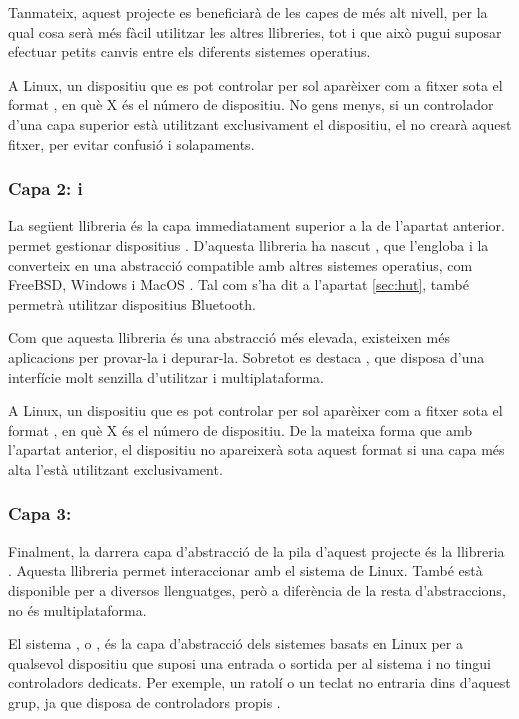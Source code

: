 Tanmateix, aquest projecte es beneficiarà de les capes de més alt nivell, per la qual cosa
serà més fàcil utilitzar les altres llibreries, tot i que això pugui suposar
efectuar petits canvis entre els diferents sistemes operatius.

A Linux, un dispositiu que es pot controlar per  sol aparèixer com
a fitxer sota el format , en què X és el número de dispositiu.
No gens menys, si un controlador d'una capa superior està utilitzant
exclusivament el dispositiu, el  no crearà aquest fitxer, per
evitar confusió i solapaments.

\subsubsection*{Capa 2:  i }

La següent llibreria és la capa immediatament superior a la de l'apartat
anterior.  permet gestionar dispositius . D'aquesta
llibreria ha nascut , que l'engloba i la converteix en
una abstracció compatible amb altres sistemes operatius, com
FreeBSD, Windows i MacOS \cite{Libhid}. Tal com s'ha dit a 
l'apartat \ref{sec:hut}, també permetrà utilitzar dispositius Bluetooth.

Com que aquesta llibreria és una abstracció més elevada, existeixen més aplicacions
per provar-la i depurar-la. Sobretot es destaca \cite{LibhidUI}, que disposa
d'una interfície molt senzilla d'utilitzar i multiplataforma.

A Linux, un dispositiu que es pot controlar per  sol aparèixer com
a fitxer sota el format , en què X és el número de dispositiu.
De la mateixa forma que amb l'apartat anterior, el dispositiu no apareixerà
sota aquest format si una capa més alta l'està utilitzant exclusivament.

\subsubsection*{Capa 3: }

Finalment, la darrera capa d'abstracció de la pila d'aquest projecte és la
llibreria .
Aquesta llibreria permet interaccionar amb el sistema
 de Linux. També està disponible per a diversos llenguatges, però
a diferència de la resta d'abstraccions, no és multiplataforma.

El sistema , o , és la capa d'abstracció
dels sistemes basats en Linux per a qualsevol dispositiu que suposi una entrada
o sortida per al sistema i no tingui controladors dedicats. Per exemple, un
ratolí o un teclat no entraria dins d'aquest grup, ja que disposa de controladors
propis \cite{Iio}.

